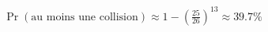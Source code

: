 \documentclass[preview]{standalone}
\begin{document}
\begin{align*}
\Pr(\text{au moins une collision}) \approx 1 - \left(\frac{25}{26}\right)^{13} \approx 39.7\%
\end{align*}
\end{document}
